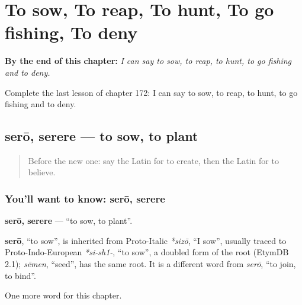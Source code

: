 
\chapter{To sow, To reap, To hunt, To go fishing, To deny}
\label{ch:la-to-sow-to-reap-to-hunt-to-go-fishing-to-deny}

\begin{chapteropening}
\textbf{By the end of this chapter:} \emph{I can say to sow, to reap, to hunt, to go fishing and to deny.}

Complete the last lesson of chapter 172: I can say to sow, to reap, to hunt, to go fishing and to deny.
\end{chapteropening}

\section[serō, serere]{serō, serere — to sow, to plant}

\label{lesson:LA-C172-sero}



\begin{quote}
Before the new one: say the Latin for to create, then the Latin for to believe.
\end{quote}

\subsection*{You'll want to know: serō, serere}
\textbf{serō, serere} — \textquotedblleft{}to sow, to plant\textquotedblright{}.

\begin{cousinweb}
\textbf{serō}, \textquotedblleft{}to sow\textquotedblright{}, is inherited from Proto-Italic \emph{*sizō}, \textquotedblleft{}I sow\textquotedblright{}, usually traced to Proto-Indo-European \emph{*si-sh1-}, \textquotedblleft{}to sow\textquotedblright{}, a doubled form of the root (EtymDB 2.1); \emph{sēmen}, \textquotedblleft{}seed\textquotedblright{}, has the same root. It is a different word from \emph{serō}, \textquotedblleft{}to join, to bind\textquotedblright{}.
\end{cousinweb}

\begin{grammarlens}[title={What you've built}]
One more word for this chapter.
\end{grammarlens}

